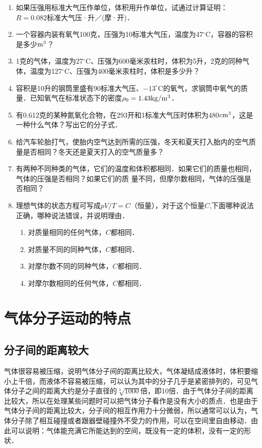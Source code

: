 \begin{enumerate}
	\item 如果压强用标准大气压作单位，体积用升作单位，试通过计算证明：$R=0.082$标准大气压·升／(摩·开)．
\item 一个容器内装有氧气100克，压强为10标准大气压，温度为47$^\circ$C，容器的容积是多少${\rm m^3}$？
\item 1克的气体，温度为27$^\circ$C、压强为600毫米汞柱时，体积为5升，2克的同种气体，温度为127$^\circ$C、压强为400毫米汞柱时，体积是多少升？
\item 容积是10升的钢筒里盛有90标准大气压、$-13^\circ$C的氧气，求钢筒中氧气的质量．已知氧气在标准状态下的密度$\rho_0=1.43{\rm kg}/{\rm m^3}$．
\item 有0.612克的某种氮氧化合物，在293开和1标准大气压时体积为480${\rm cm^3}$，这是一种什么气体？写出它的分子式．
\item 给汽车轮胎打气，使胎内空气达到所需的压强，冬天和夏天打入胎内的空气质量是否相同？冬天还是夏天打入的空气质量多？
\item 有两种不同种类的气体，它们的温度和体积都相同．如果它们的质量也相同，气体的压强是否相同？如果它们的质
量不同，但摩尔数相同，气体的压强是否相同？
\item 理想气体的状态方程可写成$pV/T=C$（恒量），对于这个恒量$C$,下面哪种说法正确，哪种说法错误，并说明理由．
\begin{enumerate}
\item 对质量相同的任何气体，$C$都相同．\item 对质量不同的同种气体，$C$都相同．	\item 对摩尔数不同的同种气体，$C$都相同．\item 对摩尔数相同的任何气体，$C$都相同．
\end{enumerate}
\end{enumerate}

\section{气体分子运动的特点}
\subsection{分子间的距离较大} 
气体很容易被压缩，说明气体分子间的距离比较大，气体凝结成液体时，体积要缩小上千倍，而液体不容易被压缩，可以认为其中的分子几乎是紧密排列的，可见气体分子之间的距离大约是分子直径的$\sqrt[3]{1000}$倍，即10倍．由于气体分子间的距离比较大，所以在处理某些问题时可以把气体分子看作是没有大小的质点．也是由于气体分子间的距离比较大，分子间的相互作用力十分微弱，所以通常可以认为，气体分子除了相互碰撞或者跟器壁碰撞外不受力的作用，可以在空间里自由移动．由此可以说明：气体能充满它所能达到的空间，既没有一定的体积，没有一定的形状．

